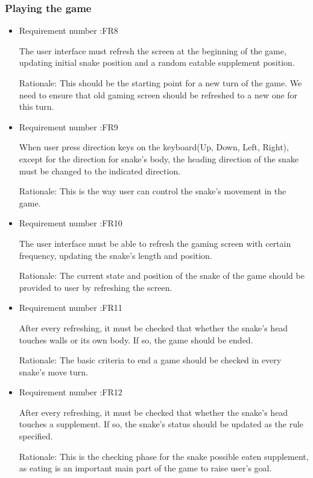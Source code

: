 \documentclass[12pt, titlepage]{article}
\begin{document}
\subsubsection{Playing the game}
\begin{itemize}
		\item Requirement number :FR8 
		
		The user interface must refresh the screen at the beginning of the game, updating initial snake position and a random eatable supplement position.  
		 
		Rationale: This should be the starting point for a new turn of the game. We need to ensure that old gaming screen should be refreshed to a new one for this turn.
		
		\item Requirement number :FR9  
		
		 When user press direction keys on the keyboard(Up, Down, Left, Right), except for the direction for snake's body, the heading direction of the snake must be changed to the indicated direction.
		 
		Rationale: This is the way user can control the snake's movement in the game.
		
		\item Requirement number :FR10 
		
		 The user interface must be able to refresh the gaming screen with certain frequency, updating the snake's length and position.
		 
		 Rationale: The current state and position of the snake of the game should be provided to user by refreshing the screen.
		\item Requirement number :FR11  
		
		 After every refreshing, it must be checked that whether the snake's head touches walls or its own body. If so, the game should be ended. 
		 
		Rationale: The basic criteria to end a game should be checked in every snake's move turn. 
		\item Requirement number :FR12  
		
		 After every refreshing, it must be checked that whether the snake's head touches a supplement. If so, the snake's status should be updated as the rule specified. 
		 
		Rationale: This is the checking phase for the snake possible eaten supplement, as eating is an important main part of the game to raise user's goal.
		
	\end{itemize}
\end{document}
